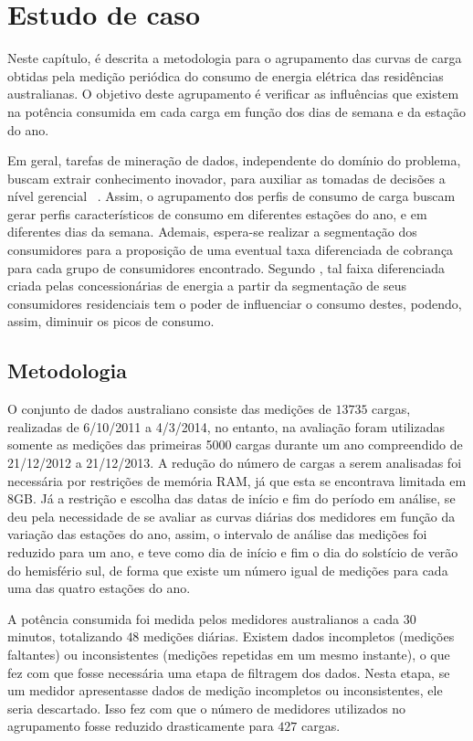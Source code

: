 \chapter{Estudo de caso} \label{cap:estudo_de_caso}

Neste capítulo, é descrita a metodologia para o agrupamento das curvas de carga obtidas pela medição periódica do consumo de energia elétrica das residências australianas. O objetivo deste agrupamento é verificar as influências que existem na potência consumida em cada carga em função dos dias de semana e da estação do ano. 

Em geral, tarefas de mineração de dados, independente do domínio do problema, buscam  extrair conhecimento inovador, para auxiliar as tomadas de decisões a nível gerencial ~\parencite{carvalhointeligencia}. Assim, o agrupamento dos perfis de consumo de carga buscam gerar perfis característicos de consumo em diferentes estações do ano, e em diferentes dias da semana. Ademais, espera-se realizar a segmentação dos consumidores para a proposição de uma eventual taxa diferenciada de cobrança para cada grupo de consumidores encontrado. Segundo \parencite{Flath2012}, tal faixa diferenciada criada pelas concessionárias de energia a partir da segmentação de seus consumidores residenciais tem o poder de influenciar o consumo destes, podendo, assim, diminuir os picos de consumo.

\section{Metodologia}

O conjunto de dados australiano consiste das medições de $13735$ cargas, realizadas de 6/10/2011 a 4/3/2014, no entanto, na avaliação foram utilizadas somente as medições das primeiras 5000 cargas durante um ano compreendido de 21/12/2012 a 21/12/2013. A redução do número de cargas a serem analisadas foi necessária por restrições de memória RAM, já que esta se encontrava limitada em 8GB. Já a restrição e escolha das datas de início e fim do período em análise, se deu pela necessidade de se avaliar as curvas diárias dos medidores em função da variação das estações do ano, assim, o intervalo de análise das medições foi reduzido para um ano, e teve como dia de início e fim o dia do solstício de verão do hemisfério sul, de forma que existe um número igual de medições para cada uma das quatro estações do ano.

A potência consumida foi medida pelos medidores australianos a cada $30$ minutos, totalizando $48$ medições diárias. Existem dados incompletos (medições faltantes) ou inconsistentes (medições repetidas em um mesmo instante), o que fez com que fosse necessária uma etapa de filtragem dos dados. Nesta etapa, se um medidor apresentasse dados de medição incompletos ou inconsistentes, ele seria descartado. Isso fez com que o número de medidores utilizados no agrupamento fosse reduzido drasticamente para $427$ cargas.

